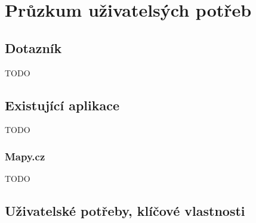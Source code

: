 \documentclass{article}
\begin{document}
\section{Průzkum uživatelsých potřeb}

\subsection{Dotazník}

TODO

\subsection{Existující aplikace}

TODO

\subsubsection{Mapy.cz}
TODO

\subsection{Uživatelské potřeby, klíčové vlastnosti}
\end{document}
